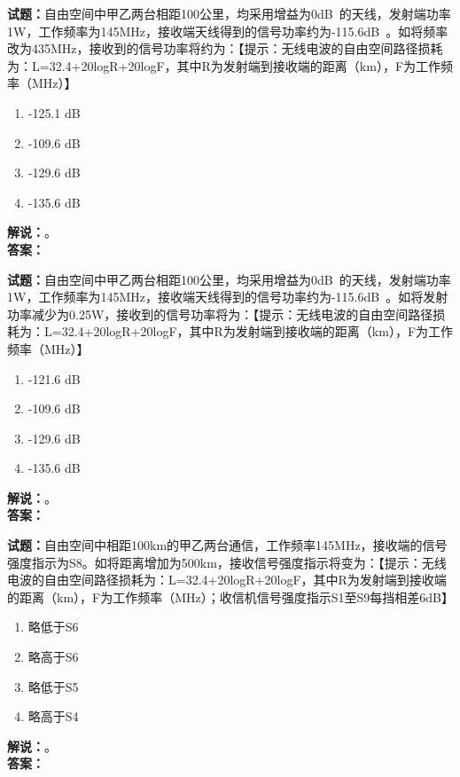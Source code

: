 \documentclass{ctexbook}
\begin{document}
\bigskip

\noindent\textbf{试题：}自由空间中甲乙两台相距100公里，均采用增益为0\unit[qualifier-mode=combine]{\deci\bel{}}的天线，发射端功率1W，工作频率为145\unit{\MHz}，接收端天线得到的信号功率约为-115.6\unit[qualifier-mode=combine]{\deci\bel{}}。如将频率改为435\unit{\MHz}，接收到的信号功率将约为：【提示：无线电波的自由空间路径损耗为：L=32.4+20logR+20logF，其中R为发射端到接收端的距离（km），F为工作频率（\unit{\MHz}）】
\begin{enumerate}[leftmargin=3em]
  \item -125.1 \unit[qualifier-mode=combine]{\deci\bel{}}
  \item -109.6 \unit[qualifier-mode=combine]{\deci\bel{}}
  \item -129.6 \unit[qualifier-mode=combine]{\deci\bel{}}
  \item -135.6 \unit[qualifier-mode=combine]{\deci\bel{}}
\end{enumerate}
\noindent\textbf{解说：}\textbf{}。\\\noindent\textbf{答案：}

\bigskip

\noindent\textbf{试题：}自由空间中甲乙两台相距100公里，均采用增益为0\unit[qualifier-mode=combine]{\deci\bel{}}的天线，发射端功率1W，工作频率为145\unit{\MHz}，接收端天线得到的信号功率约为-115.6\unit[qualifier-mode=combine]{\deci\bel{}}。如将发射功率减少为0.25W，接收到的信号功率将为：【提示：无线电波的自由空间路径损耗为：L=32.4+20logR+20logF，其中R为发射端到接收端的距离（km），F为工作频率（\unit{\MHz}）】
\begin{enumerate}[leftmargin=3em]
  \item -121.6 \unit[qualifier-mode=combine]{\deci\bel{}}
  \item -109.6 \unit[qualifier-mode=combine]{\deci\bel{}}
  \item -129.6 \unit[qualifier-mode=combine]{\deci\bel{}}
  \item -135.6 \unit[qualifier-mode=combine]{\deci\bel{}}
\end{enumerate}
\noindent\textbf{解说：}\textbf{}。\\\noindent\textbf{答案：}

\bigskip

\noindent\textbf{试题：}自由空间中相距100km的甲乙两台通信，工作频率145\unit{\MHz}，接收端的信号强度指示为S8。如将距离增加为500km，接收信号强度指示将变为：【提示：无线电波的自由空间路径损耗为：L=32.4+20logR+20logF，其中R为发射端到接收端的距离（km），F为工作频率（\unit{\MHz}）；收信机信号强度指示S1至S9每挡相差6dB】
\begin{enumerate}[leftmargin=3em]
  \item 略低于S6
  \item 略高于S6
  \item 略低于S5
  \item 略高于S4
\end{enumerate}
\noindent\textbf{解说：}\textbf{}。\\\noindent\textbf{答案：}
\end{document}
